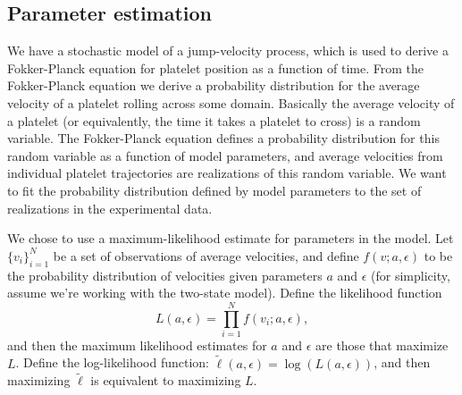 

\subsection{Parameter estimation}
\label{sec:parameter-estimation}


We have a stochastic model of a jump-velocity process, which is used
to derive a Fokker-Planck equation for platelet position as a function
of time. From the Fokker-Planck equation we derive a probability
distribution for the average velocity of a platelet rolling across
some domain. Basically the average velocity of a platelet (or
equivalently, the time it takes a platelet to cross) is a random
variable. The Fokker-Planck equation defines a probability
distribution for this random variable as a function of model
parameters, and average velocities from individual platelet
trajectories are realizations of this random variable. We want to fit
the probability distribution defined by model parameters to the set of
realizations in the experimental data.

We chose to use a maximum-likelihood estimate for parameters in the
model. Let $\{v_i\}_{i=1}^N$ be a set of observations of average
velocities, and define $f(v;a, \epsilon)$ to be the probability
distribution of velocities given parameters $a$ and $\epsilon$ (for
simplicity, assume we're working with the two-state model). Define the
likelihood function
\begin{equation}
  \label{eq:likelihood}
  L(a, \epsilon) = \prod_{i=1}^N f(v_i; a, \epsilon),
\end{equation}
and then the maximum likelihood estimates for $a$ and $\epsilon$ are
those that maximize $L$. Define the log-likelihood function:
$\tilde{\ell}(a, \epsilon) = \log(L(a, \epsilon))$, and then
maximizing $\tilde{\ell}$ is equivalent to maximizing $L$.

